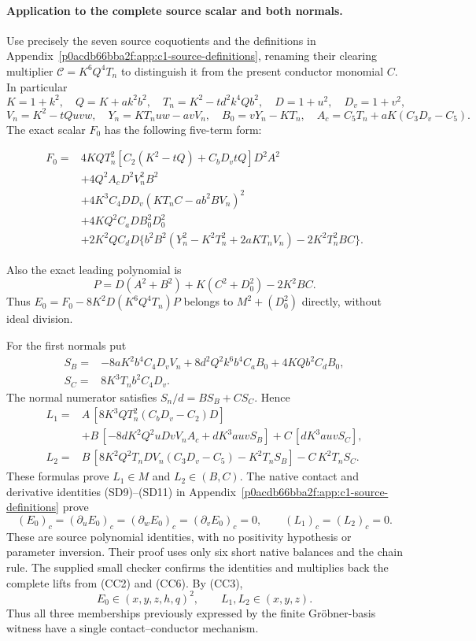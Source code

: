 \paragraph{Application to the complete source scalar and both normals.}
Use precisely the seven source coquotients and the definitions in
Appendix~\ref{p0acdb66bba2f:app:c1-source-definitions}, renaming their clearing multiplier $\mathcal C=K^6Q^4T_n$
to distinguish it from the present conductor monomial $C$. In particular
\[
 K=1+k^2,\quad Q=K+ak^2b^2,\quad T_n=K^2-td^2k^4Qb^2,
 \quad D=1+u^2,\quad D_v=1+v^2,
\]
\[
 V_n=K^2-tQuvw,\quad Y_n=KT_nuw-avV_n,
 \quad B_0=vY_n-KT_n,
 \quad A_c=C_5T_n+aK(C_3D_v-C_5).
\]
The exact scalar $F_0$ has the following five-term form:
\begin{samepage}
\begin{align*}
F_0={}&4KQT_n^2[C_2(K^2-tQ)+C_bD_vtQ]D^2A^2\\
 &+4Q^2A_cD^2V_n^2B^2\\
 &+4K^3C_4DD_v(KT_nC-ab^2BV_n)^2\\
 &+4KQ^2C_aDB_0^2D_0^2\\
 &+2K^2QC_dD\{b^2B^2(Y_n^2-K^2T_n^2+2aKT_nV_n)
                         -2K^2T_n^2BC\}.
\end{align*}
\end{samepage}
Also the exact leading polynomial is
\[
 P=D(A^2+B^2)+K(C^2+D_0^2)-2K^2BC.
\]
Thus $E_0=F_0-8K^2D(K^6Q^4T_n)P$ belongs to
$M^2+(D_0^2)$ directly, without ideal division.

For the first normals put
\begin{align*}
 S_B={}&-8aK^2b^4C_4D_vV_n
          +8d^2Q^2k^6b^4C_aB_0+4KQb^2C_dB_0,\\
 S_C={}&8K^3T_nb^2C_4D_v.
\end{align*}
The normal numerator satisfies $S_n/d=BS_B+CS_C$. Hence
\begin{align*}
 L_1={}& A\,[8K^3QT_n^2(C_bD_v-C_2)D]\\
 &+B\,[-8dK^2Q^2uDvV_nA_c+dK^3auvS_B]
       +C\,[dK^3auvS_C],\\
 L_2={}&B\,[8K^2Q^2T_nDV_n(C_3D_v-C_5)-K^2T_nS_B]
       -C\,K^2T_nS_C.
\end{align*}
These formulas prove $L_1\in M$ and $L_2\in(B,C)$.
The native contact and derivative identities (SD9)--(SD11) in
Appendix~\ref{p0acdb66bba2f:app:c1-source-definitions} prove
\[
 (E_0)_c=(\partial_uE_0)_c=(\partial_wE_0)_c
          =(\partial_vE_0)_c=0,\qquad (L_1)_c=(L_2)_c=0.      \tag{CC7}
\]
These are source polynomial identities, with no positivity hypothesis or
parameter inversion. Their proof uses only six short native balances and
the chain rule. The supplied small checker confirms the identities and
multiplies back the complete lifts from (CC2) and (CC6).
By (CC3),
\[
 E_0\in(x,y,z,h,q)^2,\qquad L_1,L_2\in(x,y,z).          \tag{CC8}
\]
Thus all three memberships previously expressed by the finite
Gr\"obner-basis witness have a single contact--conductor mechanism.

